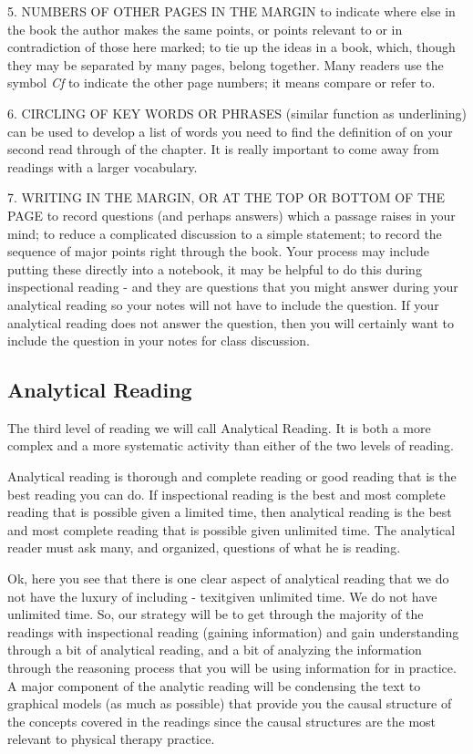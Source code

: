 5. NUMBERS OF OTHER PAGES IN THE MARGIN to indicate where else in the book the author makes the same points, or points relevant to or in contradiction of those here marked; to tie up the ideas in a book, which, though they may be separated by many pages, belong together. Many readers use the symbol \textit{Cf} to indicate the other page numbers; it means compare or refer to.

6. CIRCLING OF KEY WORDS OR PHRASES (similar function as underlining) can be used to develop a list of words you need to find the definition of on your second read through of the chapter. It is really important to come away from readings with a larger vocabulary.

7. WRITING IN THE MARGIN, OR AT THE TOP OR BOTTOM OF THE PAGE to record questions (and perhaps answers) which a passage raises in your mind; to reduce a complicated discussion to a simple statement; to record the sequence of major points right through the book. Your process may include putting these directly into a notebook, it may be helpful to do this during inspectional reading - and they are questions that you might answer during your analytical reading so your notes will not have to include the question. If your analytical reading does not answer the question, then you will certainly want to include the question in your notes for class discussion.

\subsection{Analytical Reading}
\begin{displayquote}
The third level of reading we will call Analytical Reading. It is both a more complex and a more systematic activity than either of the two levels of reading.

Analytical reading is thorough and complete reading or good reading that is the best reading you can do. If inspectional reading is the best and most complete reading that is possible given a limited time, then analytical reading is the best and most complete reading that is possible given unlimited time. The analytical reader must ask many, and organized, questions of what he is reading.
\end{displayquote}

Ok, here you see that there is one clear aspect of analytical reading that we do not have the luxury of including - texit{given unlimited time}. We do not have unlimited time. So, our strategy will be to get through the majority of the readings with inspectional reading (gaining information) and gain understanding through a bit of analytical reading, and a bit of analyzing the information through the reasoning process that you will be using information for in practice. A major component of the analytic reading will be condensing the text to graphical  models (as much as possible) that provide you the causal structure of the concepts covered in the readings since the causal structures are the most relevant to physical therapy practice.

